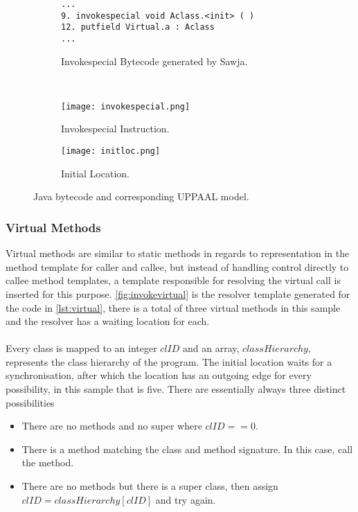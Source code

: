 \begin{figure}[H]
\centering
\begin{subfigure}{\textwidth}
  \begin{lstlisting}[numbers=none]
...
9. invokespecial void Aclass.<init> ( )
12. putfield Virtual.a : Aclass
...
  \end{lstlisting}
  \caption{Invokespecial Bytecode generated by Sawja.}
\end{subfigure} \\
\begin{subfigure}{.65\textwidth}
  \texttt{[image: invokespecial.png]}
  \caption{Invokespecial Instruction.}
\end{subfigure}
\hspace{10px}
\begin{subfigure}{.25\textwidth}
  \texttt{[image: initloc.png]}
  \caption{Initial Location.}
\end{subfigure}
\caption{Java bytecode and corresponding UPPAAL model.}
\label{fig:invokespecial}
\end{figure}


\subsubsection{Virtual Methods}
Virtual methods are similar to static methods in regards to representation in the method template for caller and callee, but instead of handling control directly to callee method templates, a template responsible for resolving the virtual call is inserted for this purpose.
\cref{fig:invokevirtual} is the resolver template generated for the code in \cref{lst:virtual}, there is a total of three virtual methods in this sample and the resolver has a waiting location for each.\\\\
Every class is mapped to an integer $clID$ and an array, $classHierarchy$, represents the class hierarchy of the program. The initial location  waits for a synchronisation, after which the location  has an outgoing edge for every possibility, in this sample that is five. There are essentially always three distinct possibilities 

\begin{itemize}
\item There are no methods and no super where $clID == 0$.
\item There is a method matching the class and method signature. In this case, call the method.
\item There are no methods but there is a super class, then assign $clID = classHierarchy[clID]$ and try again.
\end{itemize}

